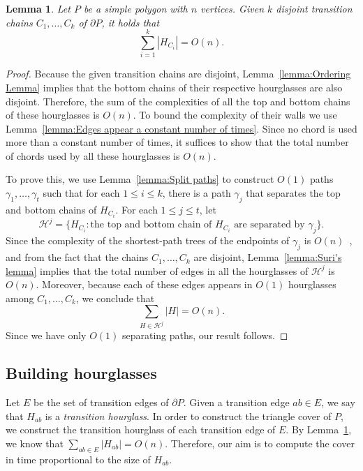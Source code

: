 \documentclass[a4paper]{article}
\newtheorem{lemma}[theorem]{Lemma}
\begin{document}
\begin{lemma}\label{lemma:Bounding complexity of hourglasses}
Let $P$ be a simple polygon with $n$ vertices.
Given $k$ disjoint transition chains $C_1, \ldots, C_k$  of $\partial P$, it holds that  $$\sum_{i=1}^k |H_{C_i}| = O(n).$$
\end{lemma}
\begin{proof}

Because the given transition chains are disjoint, Lemma~\ref{lemma:Ordering Lemma} implies that the bottom chains of their respective hourglasses are also disjoint. Therefore, the sum of the complexities of all the top and bottom chains of these hourglasses is $O(n)$. 
To bound the complexity of their walls we use
Lemma~\ref{lemma:Edges appear a constant number of times}. Since  no chord is used more than a constant number of times, it suffices to show that the total number of chords used by all these hourglasses is $O(n)$.

To prove this, we use Lemma~\ref{lemma:Split paths} to construct $O(1)$ paths $\gamma_1, \ldots, \gamma_t$ such that for each $1\leq i\leq k$, there is a path $\gamma_j$ that separates the top and bottom chains of $H_{C_i}$.
For each $1\leq j\leq t$, let $$\mathcal H^j = \{H_{C_i} : \text{the top and bottom chain of $H_{C_i}$ are separated by }\gamma_j\}.$$
Since the complexity of the shortest-path trees of the endpoints of $\gamma_j$ is $O(n)$~\cite{guibasShortestPathTree},
and from the fact that the chains $C_1, \ldots, C_k$ are disjoint,  Lemma~\ref{lemma:Suri's lemma} implies that
the total number of edges in all the hourglasses of $\mathcal H^j$ is $O(n)$. Moreover, because each of these edges appears in $O(1)$ hourglasses among $C_1, \ldots, C_k$, we conclude that 
$$\sum_{H \in \mathcal H^j } |H| = O(n).$$
Since we have only $O(1)$ separating paths, our result follows.
\end{proof}

\subsection{Building hourglasses}

Let $E$ be the set of transition edges of $\partial P$.
Given a transition edge $ab\in E$, we say that $H_{ab}$ is a \emph{transition hourglass}.
In order to construct the triangle cover of $P$, we construct the transition hourglass of each transition edge of $E$. By Lemma~\ref{lemma:Bounding complexity of hourglasses}, we know that $\sum_{ab\in E} |H_{ab}| = O(n)$. Therefore, our aim is to compute the cover in time proportional to the size of $H_{ab}$. %
\end{document}
